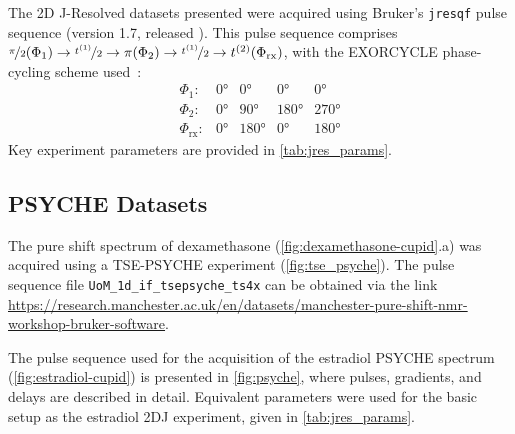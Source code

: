 The 2D J-Resolved datasets presented were acquired using Bruker's
\texttt{jresqf} pulse sequence (version 1.7, released
). This pulse sequence comprises
 $\nicefrac{\pi}{2}(\Phi_1) \rightarrow \nicefrac{t^{(1)}}{2} \rightarrow
\pi(\Phi_{2}) \rightarrow \nicefrac{t^{(1)}}{2} \rightarrow t^{(2)}(\Phi_{\text{rx}})$, with
the EXORCYCLE phase-cycling scheme used~\cite[Section 11.6]{Keeler2010}:
\begin{equation*}
    \begin{array}{lllll}
        \Phi_{1}: & \ang{0} & \ang{0} & \ang{0} & \ang{0} \\
        \Phi_{2}: & \ang{0} & \ang{90} & \ang{180} & \ang{270} \\
        \Phi_{\text{rx}}: & \ang{0} & \ang{180} & \ang{0} & \ang{180}
    \end{array}
\end{equation*}
Key experiment parameters are provided in \cref{tab:jres_params}.


\subsection{\acs{PSYCHE} Datasets}
\label{subsec:psyche-datasets}
The pure shift spectrum of dexamethasone (\cref{fig:dexamethasone-cupid}.a) was
acquired using a \ac{TSE-PSYCHE}
experiment (\cref{fig:tse_psyche}). The pulse sequence file
\texttt{UoM\_1d\_if\_tsepsyche\_ts4x} can be obtained via the link
\url{https://research.manchester.ac.uk/en/datasets/manchester-pure-shift-nmr-workshop-bruker-software}.

The pulse sequence used for the acquisition of the estradiol \ac{PSYCHE}
spectrum (\cref{fig:estradiol-cupid}) is presented in
\cref{fig:psyche}, where
pulses, gradients, and delays are described in detail. Equivalent parameters
were used for the basic setup as the estradiol 2DJ experiment, given in
\cref{tab:jres_params}.

